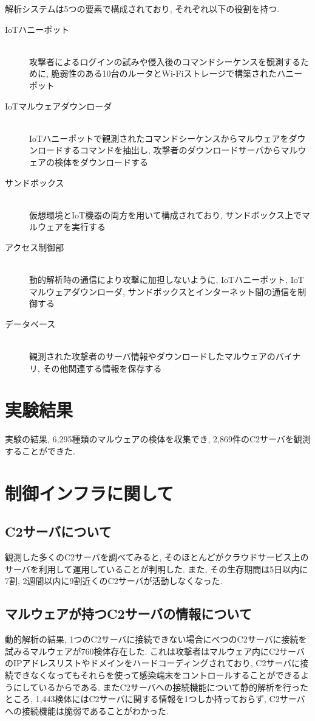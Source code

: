 \documentclass[twocolumn,10pt]{ltjsarticle}
\begin{document}
解析システムは5つの要素で構成されており, それぞれ以下の役割を持つ. 

\begin{description}
    \item[IoTハニーポット]~\\
    攻撃者によるログインの試みや侵入後のコマンドシーケンスを観測するために, 
    脆弱性のある10台のルータとWi-Fiストレージで構築されたハニーポット
    \item[IoTマルウェアダウンローダ]~\\
    IoTハニーポットで観測されたコマンドシーケンスからマルウェアをダウンロードするコマンドを抽出し, 
    攻撃者のダウンロードサーバからマルウェアの検体をダウンロードする
    \item[サンドボックス]~\\
    仮想環境とIoT機器の両方を用いて構成されており, サンドボックス上でマルウェアを実行する
    \item[アクセス制御部]~\\
    動的解析時の通信により攻撃に加担しないように, 
    IoTハニーポット, IoTマルウェアダウンローダ, サンドボックスとインターネット間の通信を制御する
    \item[データベース]~\\
    観測された攻撃者のサーバ情報やダウンロードしたマルウェアのバイナリ, その他関連する情報を保存する
\end{description}

\section{実験結果}
実験の結果, 6,295種類のマルウェアの検体を収集でき, 2,869件のC2サーバを観測することができた. 

\section{制御インフラに関して}
\subsection{C2サーバについて}
観測した多くのC2サーバを調べてみると, そのほとんどがクラウドサービス上のサーバを利用して運用していることが判明した. 
また, その生存期間は5日以内に7割, 2週間以内に9割近くのC2サーバが活動しなくなった. 

\subsection{マルウェアが持つC2サーバの情報について}
動的解析の結果, 1つのC2サーバに接続できない場合にべつのC2サーバに接続を試みるマルウェアが760検体存在した. 
これは攻撃者はマルウェア内にC2サーバのIPアドレスリストやドメインをハードコーディングされており, 
C2サーバに接続できなくなってもそれらを使って感染端末をコントロールすることができるようにしているからである. 
またC2サーバへの接続機能について静的解析を行ったところ, 1,443検体にはC2サーバに関する情報を1つしか持っておらず, 
C2サーバへの接続機能は脆弱であることがわかった. 
\end{document}
